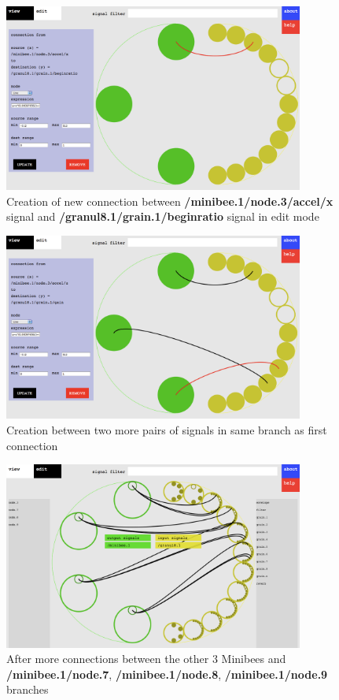\begin{figure}[htb]
\centering
\includegraphics[width=0.88\textwidth]{vizmapperSeven.png}
\caption{Creation of new connection between \textbf{/minibee.1/node.3/accel/x} signal and \textbf{/granul8.1/grain.1/beginratio} signal in edit mode}
\label{fig:vizSeven}
\end{figure}

\begin{figure}[hp]
\centering
\includegraphics[width=0.88\textwidth]{vizmapperEight.png}
\caption{Creation between two more pairs of signals in same branch as first connection}
\label{fig:vizEight}
\end{figure}

\begin{figure}[hp]
\centering
\includegraphics[width=0.88\textwidth]{vizmapperNine.png}
\caption{After more connections between the other 3 Minibees and \textbf{/minibee.1/node.7}, \textbf{/minibee.1/node.8}, \textbf{/minibee.1/node.9} branches}
\label{fig:vizNine}
\end{figure}

